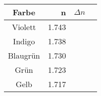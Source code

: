 \begin{tabular}{c|rrr}
Farbe  & n & $\Delta n$ \\
\hline
Violett & 1.743\\
Indigo & 1.738\\
Blaugrün & 1.730\\
Grün & 1.723\\
Gelb & 1.717
\end{tabular}